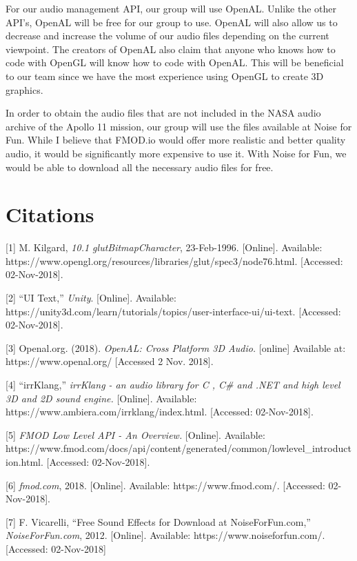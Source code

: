 \documentclass[onecolumn, draftclsnofoot,10pt, compsoc]{IEEEtran}
\begin{document}
For our audio management API, our group will use OpenAL. Unlike the other API's, OpenAL will be free for our group to use. OpenAL will also allow us to decrease and increase the volume of our audio files depending on the current viewpoint. The creators of OpenAL also claim that anyone who knows how to code with OpenGL will know how to code with OpenAL. This will be beneficial to our team since we have the most experience using OpenGL to create 3D graphics.

In order to obtain the audio files that are not included in the NASA audio archive of the Apollo 11 mission, our group will use the files available at Noise for Fun. While I believe that FMOD.io would offer more realistic and better quality audio, it would be significantly more expensive to use it. With Noise for Fun, we would be able to  download all the necessary audio files for free. 
\newpage
\section{Citations}
[1] M. Kilgard, \textit{10.1 glutBitmapCharacter}, 23-Feb-1996. [Online]. 
\newline
Available: https://www.opengl.org/resources/libraries/glut/spec3/node76.html. [Accessed: 02-Nov-2018].

[2] “UI Text,” \textit{Unity}. [Online]. Available: https://unity3d.com/learn/tutorials/topics/user-interface-ui/ui-text. [Accessed: 02-Nov-2018].

[3] Openal.org. (2018). \textit{OpenAL: Cross Platform 3D Audio.} [online] Available at: https://www.openal.org/ [Accessed 2 Nov. 2018].
 
[4] “irrKlang,” \textit{irrKlang - an audio library for C , C# and .NET and high level 3D and 2D sound engine.} [Online]. Available: https://www.ambiera.com/irrklang/index.html. [Accessed: 02-Nov-2018].

[5] \textit{FMOD Low Level API - An Overview.} [Online]. 
\newline
Available: https://www.fmod.com/docs/api/content/generated/common/lowlevel\_introduction.html. [Accessed: 02-Nov-2018].

[6] \textit{fmod.com}, 2018. [Online]. Available: https://www.fmod.com/. [Accessed: 02-Nov-2018].

[7] F. Vicarelli, “Free Sound Effects for Download at NoiseForFun.com,” \textit{NoiseForFun.com}, 2012. [Online]. Available: https://www.noiseforfun.com/. [Accessed: 02-Nov-2018]
\end{document}
